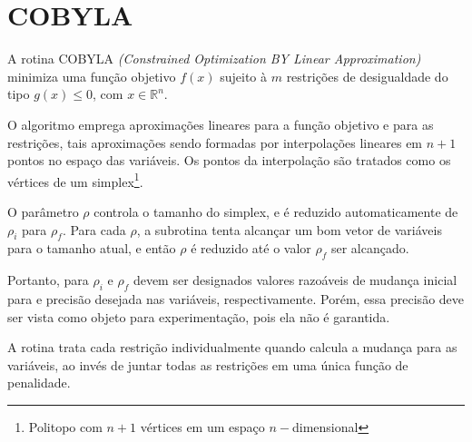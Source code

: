 %
%
%

\section{COBYLA}

\label{cobyla}
A rotina COBYLA \emph{(Constrained Optimization BY Linear Approximation)}
minimiza uma função objetivo $f(x)$ sujeito à $m$ restrições de desigualdade
do tipo $g(x)\leq0$, com $x\in\mathbb{R}^n$.

O algoritmo emprega aproximações lineares para a função objetivo e para as
restrições, tais aproximações sendo formadas por interpolações lineares em
$n+1$ pontos no espaço das variáveis. Os pontos da interpolação são tratados
como os vértices de um simplex\footnote{Politopo com $n+1$ vértices em um
espaço $n-$dimensional}.

O parâmetro $\rho$ controla o tamanho do simplex, e é reduzido automaticamente
de $\rho_i$ para $\rho_f$. Para cada $\rho$, a subrotina tenta alcançar um bom
vetor de variáveis para o tamanho atual, e então $\rho$ é reduzido até o valor
$\rho_f$ ser alcançado.

Portanto, para $\rho_i$ e $\rho_f$ devem ser designados valores razoáveis de
mudança inicial para e precisão desejada nas variáveis, respectivamente. Porém,
essa precisão deve ser vista como objeto para experimentação, pois ela não é
garantida.

A rotina trata cada restrição individualmente quando calcula a mudança para as
variáveis, ao invés de juntar todas as restrições em uma única função de
penalidade.